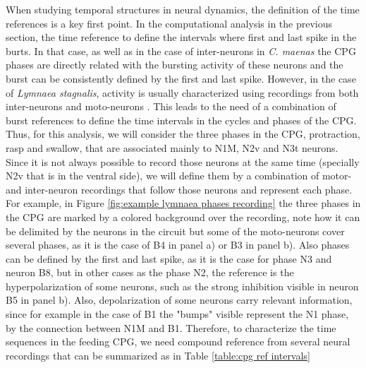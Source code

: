 When studying temporal structures in neural dynamics, the definition of the time references is a key first point. In the computational analysis in the previous section, the time reference to define the intervals where first and last spike in the burts. In that case, as well as in the case of inter-neurons in \textit{C. maenas} the CPG phases are directly related with the bursting activity of these neurons and the burst can be consistently defined by the first and last spike. However, in the case of \textit{Lymnaea stagnalis}, activity is usually characterized using recordings from both inter-neurons and moto-neurons \parencite{elliott_interactions_1985, staras_pattern-generating_1998, benjamin_distributed_2012}. This leads to the need of a combination of burst references to define the time intervals in the cycles and phases of the CPG. Thus, for this analysis, we will consider the three phases in the CPG, protraction, rasp and swallow, that are associated mainly to N1M, N2v and N3t neurons. Since it is not always possible to record those neurons at the same time (specially N2v that is in the ventral side), we will define them by a combination of motor- and inter-neuron recordings that follow those neurons and represent each phase. For example, in Figure \ref{fig:example lymnaea phases recording} the three phases in the  CPG are marked by a colored background over the recording, note how it can be delimited by the neurons in the circuit but some of the moto-neurons cover several phases, as it is the case of B4 in panel a) or B3 in panel b). Also phases can be defined by the first and last spike, as it is the case for phase N3 and neuron B8, but in other cases as the phase N2, the reference is the hyperpolarization of some neurons, such as the strong inhibition visible in neuron B5 in panel b). Also, depolarization of some neurons carry relevant information, since for example in the case of B1 the "bumps" visible represent the N1 phase, by the connection between N1M and B1. Therefore, to characterize the time sequences in the feeding CPG, we need compound reference from several neural recordings that can be summarized as in Table \ref{table:cpg ref intervals}

